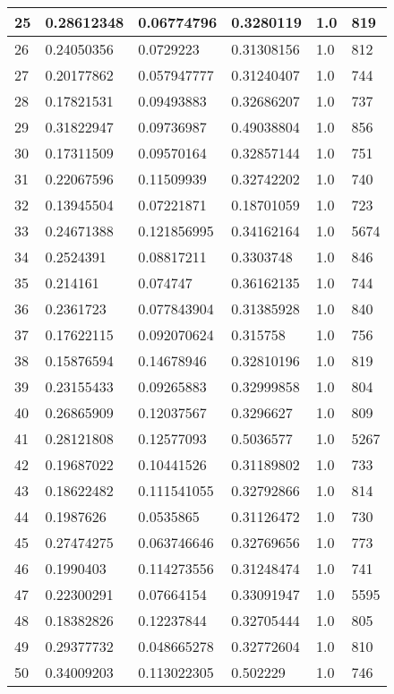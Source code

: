 \begin{longtable}{|l|l|l|l|l|l|}
25 & 0.28612348 & 0.06774796 & 0.3280119 & 1.0 & 819 \\ \hline 
26 & 0.24050356 & 0.0729223 & 0.31308156 & 1.0 & 812 \\ \hline 
27 & 0.20177862 & 0.057947777 & 0.31240407 & 1.0 & 744 \\ \hline 
28 & 0.17821531 & 0.09493883 & 0.32686207 & 1.0 & 737 \\ \hline 
29 & 0.31822947 & 0.09736987 & 0.49038804 & 1.0 & 856 \\ \hline 
30 & 0.17311509 & 0.09570164 & 0.32857144 & 1.0 & 751 \\ \hline 
31 & 0.22067596 & 0.11509939 & 0.32742202 & 1.0 & 740 \\ \hline 
32 & 0.13945504 & 0.07221871 & 0.18701059 & 1.0 & 723 \\ \hline 
33 & 0.24671388 & 0.121856995 & 0.34162164 & 1.0 & 5674 \\ \hline 
34 & 0.2524391 & 0.08817211 & 0.3303748 & 1.0 & 846 \\ \hline 
35 & 0.214161 & 0.074747 & 0.36162135 & 1.0 & 744 \\ \hline 
36 & 0.2361723 & 0.077843904 & 0.31385928 & 1.0 & 840 \\ \hline 
37 & 0.17622115 & 0.092070624 & 0.315758 & 1.0 & 756 \\ \hline 
38 & 0.15876594 & 0.14678946 & 0.32810196 & 1.0 & 819 \\ \hline 
39 & 0.23155433 & 0.09265883 & 0.32999858 & 1.0 & 804 \\ \hline 
40 & 0.26865909 & 0.12037567 & 0.3296627 & 1.0 & 809 \\ \hline 
41 & 0.28121808 & 0.12577093 & 0.5036577 & 1.0 & 5267 \\ \hline 
42 & 0.19687022 & 0.10441526 & 0.31189802 & 1.0 & 733 \\ \hline 
43 & 0.18622482 & 0.111541055 & 0.32792866 & 1.0 & 814 \\ \hline 
44 & 0.1987626 & 0.0535865 & 0.31126472 & 1.0 & 730 \\ \hline 
45 & 0.27474275 & 0.063746646 & 0.32769656 & 1.0 & 773 \\ \hline 
46 & 0.1990403 & 0.114273556 & 0.31248474 & 1.0 & 741 \\ \hline 
47 & 0.22300291 & 0.07664154 & 0.33091947 & 1.0 & 5595 \\ \hline 
48 & 0.18382826 & 0.12237844 & 0.32705444 & 1.0 & 805 \\ \hline 
49 & 0.29377732 & 0.048665278 & 0.32772604 & 1.0 & 810 \\ \hline 
50 & 0.34009203 & 0.113022305 & 0.502229 & 1.0 & 746 \\ \hline 
\end{longtable}